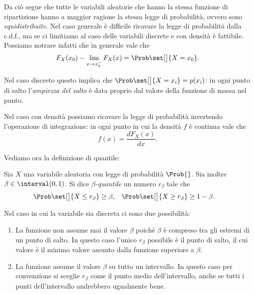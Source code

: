 Da ciò segue che tutte le variabili aleatorie che hanno la stessa funzione di ripartizione hanno a maggior ragione la stessa legge di probabilità, ovvero sono \emph{equidistribuite}. Nel caso generale è difficile ricavare la legge di probabilità dalla c.d.f., ma se ci limitiamo al caso delle variabili discrete e con densità è fattibile. Possiamo notrare infatti che in generale vale che \[
    F_X(x_0) - \lim_{x \to x_0^-} F_X(x) = \Prob\set[\big]{X = x_0}.    
\]

Nel caso discreto questo implica che $\Prob\set[\big]{X = x_i} = p(x_i)$: in ogni punto di salto l'\emph{ampiezza del salto} è data proprio dal valore della funzione di massa nel punto.

Nel caso con densità possiamo ricavare la legge di probabilità invertendo l'operazione di integrazione: in ogni punto in cui la densità $f$ è continua vale che \[
    f(x) = \frac{dF_X(x)}{dx}.    
\]

Vediamo ora la definizione di quantile:
\begin{definition}
    [Quantile]
    Sia $X$ una variabile aleatoria con legge di probabilità $\Prob{}$. Sia inoltre $\beta \in \interval({0, 1})$. Si dice \emph{$\beta$-quantile} un numero $r_\beta$ tale che \begin{align*}
        \Prob\set[\big]{X \leq r_\beta} \geq \beta,\quad &\Prob\set[\big]{X \geq r_\beta} \geq 1 - \beta.   
    \end{align*}
\end{definition}

Nel caso in cui la variabile sia discreta ci sono due possibilità:
\begin{enumerate}
    \item La funzione non assume mai il valore $\beta$ poiché $\beta$ è compreso tra gli estremi di un punto di salto.
    In questo caso l'unico $r_\beta$ possibile è il punto di salto, il cui valore è il minimo valore assunto dalla funzione superiore a $\beta$.

    \item La funzione assume il valore $\beta$ su tutto un intervallo. In questo caso per convenzione si sceglie $r_\beta$ come il punto medio dell'intervallo, anche se tutti i punti dell'intervallo andrebbero ugualmente bene.
\end{enumerate}
\begin{figure}[H]
    \begin{center}
        
    \end{center}
\end{figure}


